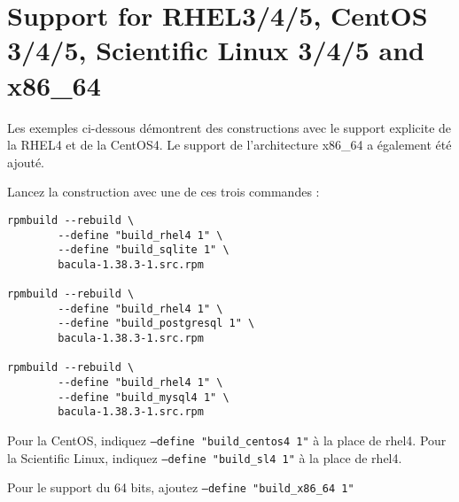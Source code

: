 \section{Support for RHEL3/4/5, CentOS 3/4/5, Scientific Linux 3/4/5 and x86\_64}

Les exemples ci-dessous démontrent des constructions avec le support 
   explicite de la RHEL4 et de la CentOS4. Le support de l'architecture x86\_64 
   a également été ajouté. 

   Lancez la construction avec une de ces trois commandes :

\footnotesize
\begin{verbatim}
rpmbuild --rebuild \
        --define "build_rhel4 1" \
        --define "build_sqlite 1" \
        bacula-1.38.3-1.src.rpm

rpmbuild --rebuild \
        --define "build_rhel4 1" \
        --define "build_postgresql 1" \
        bacula-1.38.3-1.src.rpm

rpmbuild --rebuild \
        --define "build_rhel4 1" \
        --define "build_mysql4 1" \
        bacula-1.38.3-1.src.rpm
\end{verbatim}
\normalsize

Pour la CentOS, indiquez {\tt--define "build\_centos4 1"} à la place de rhel4. 
Pour la Scientific Linux, indiquez {\tt--define "build\_sl4 1"} à la place de 
rhel4.

Pour le support du 64 bits, ajoutez {\tt--define "build\_x86\_64 1"}

